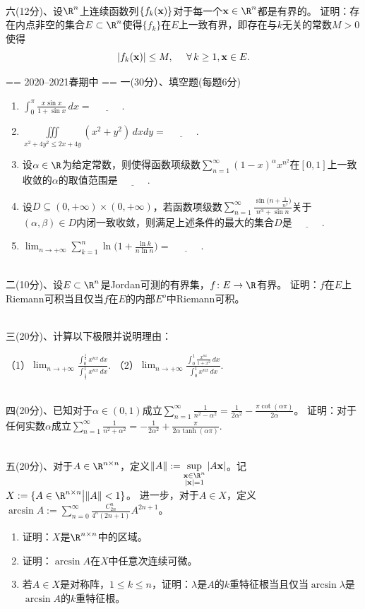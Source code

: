 ~\\
六(12分)、设$\R^n$上连续函数列$\{f_k(\mathbf{x})\}$对于每一个$\x\in\R^n$都是有界的。
证明：存在内点非空的集合$E\subset\R^n$使得$\{f_k\}$在$E$上一致有界，即存在与$k$无关的常数$M>0$使得
$$|f_k(\mathbf{x})|\le M,\quad\ \forall\,k\ge1,\mathbf{x}\in E.$$


== 2020--2021春期中 ==
一(30分）、填空题(每题6分)
\begin{enumerate}[label=(\arabic*)]
\item $\displaystyle \int_0^\pi\frac{x\sin x}{1+\sin x}\,dx=\underline{\qquad\quad}$.
\item $\displaystyle \iiint\limits_{x^2+4y^2\leq2x+4y}(x^2+y^2)\,dxdy=\underline{\qquad\quad}$.
\item 设$\alpha\in\R$为给定常数，则使得函数项级数$\displaystyle \sum_{n=1}^{\infty} (1-x)^\alpha x^{n^2}$在$[0,1]$上一致收敛的$\alpha$的取值范围是$\underline{\qquad\quad}$.
\item 设$D\subseteq(0,+\infty)\times(0,+\infty)$，若函数项级数$\displaystyle \sum_{n=1}^{\infty}\frac{\sin\big(n+\frac{1}{n^\beta}\big)}{n^\alpha+\sin n}$关于$(\alpha,\beta)\in D$内闭一致收敛，则满足上述条件的最大的集合$D$是$\underline{\qquad\quad}$.
\item $\displaystyle \lim_{n\to+\infty} \sum_{k=1}^n\ln\Big(1+\frac{\ln k}{n\ln n}\Big)=\underline{\qquad\quad}$.
\end{enumerate}
~\\
二(10分)、设$E\subset\R^n$是Jordan可测的有界集，$f\colon E\rightarrow\R$有界。
证明：$f$在$E$上Riemann可积当且仅当$f$在$E$的内部$E^o$中Riemann可积。

~\\
三(20分)、计算以下极限并说明理由：

（1）$\displaystyle \lim_{n\to+\infty} \frac{\int_0^\frac{1}{2} x^{nx}\,dx}{\int_\frac{1}{2}^1 x^{nx}\,dx}$.\qquad
（2）$\displaystyle \lim_{n\to+\infty} \frac{\int_0^1 \frac{x^{nx}}{1+x^2}\,dx}{\int_0^1 x^{nx}\,dx}$.

~\\
四(20分)、已知对于$\alpha\in(0,1)$成立$\displaystyle \sum_{n=1}^\infty\frac{1}{n^2-\alpha^2}=\frac{1}{2\alpha^2}-\frac{\pi\cot(\alpha\pi)}{2\alpha}$。
证明：对于任何实数$\alpha$成立$\displaystyle \sum_{n=1}^\infty\frac{1}{n^2+\alpha^2}=-\frac{1}{2\alpha^2}+\frac{\pi}{2\alpha\tanh(\alpha\pi)}$.

~\\
五(20分)、对于$A\in\R^{n\times n}$，定义$\|A\|:=\sup\limits_{\begin{subarray}{c}
\x\in\R^n \\ |\x|=1 \end{subarray}}|A\x|$。记$X:=\{A\in\R^{n\times n}\big|\|A\|<1\}$。
进一步，对于$A\in X$，定义$\displaystyle \arcsin A:=\sum_{n=0}^\infty\frac{C_{2n}^n}{4^n(2n+1)}A^{2n+1}$。
\begin{enumerate}[label=(\arabic*)]
\item 证明：$X$是$\R^{n\times n}$中的区域。
\item 证明：$\arcsin A$在$X$中任意次连续可微。
\item 若$A\in X$是对称阵，$1\le k\le n$，证明：$\lambda$是$A$的$k$重特征根当且仅当$\arcsin\lambda$是$\arcsin A$的$k$重特征根。
\end{enumerate}

